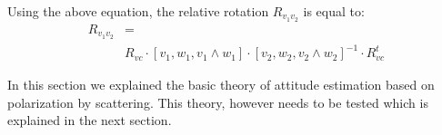 Using the above equation, the relative rotation $R_{v_{1}v_{2}}$ is equal to:
\begin{equation}
\begin{split}
  R_{v_{1}v_{2}} &= \\
   & R_{vc}\cdot\left[v_{1},w_{1},v_{1}\wedge
  w_{1}\right]\cdot\left[v_{2},w_{2},v_{2}\wedge w_{2}\right]^{-1}\cdot
R_{vc}^{t}
\end{split}
\label{eq:final-relative}
\end{equation}


In this section we explained the basic theory of attitude estimation based on
polarization by scattering.
This theory, however needs to be tested which is explained in the next section.





